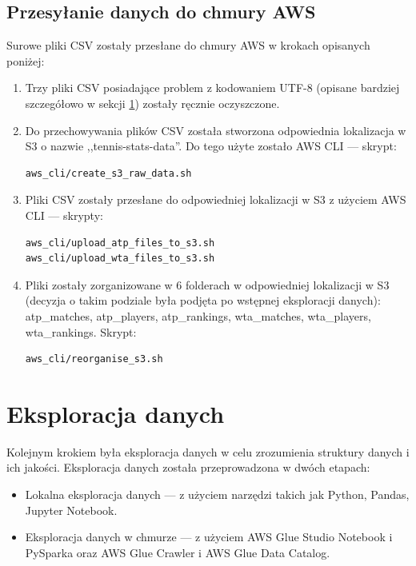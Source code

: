 \documentclass[12pt, a4paper]{article}
\begin{document}
\subsection{Przesyłanie danych do chmury AWS}
Surowe pliki CSV zostały przesłane do chmury AWS w krokach opisanych poniżej:
\begin{enumerate}
    \item Trzy pliki CSV posiadające problem z kodowaniem UTF-8 (opisane bardziej szczegółowo w sekcji \ref{sec:explore}) zostały ręcznie oczyszczone.
    \item Do przechowywania plików CSV została stworzona odpowiednia lokalizacja w S3 o nazwie ,,tennis-stats-data''. Do tego użyte zostało AWS CLI --- skrypt:
\begin{verbatim}
aws_cli/create_s3_raw_data.sh
\end{verbatim}
    \item Pliki CSV zostały przesłane do odpowiedniej lokalizacji w S3 z użyciem AWS CLI --- skrypty:
\begin{verbatim}
aws_cli/upload_atp_files_to_s3.sh
aws_cli/upload_wta_files_to_s3.sh
\end{verbatim}
    \item Pliki zostały zorganizowane w 6 folderach w odpowiedniej lokalizacji w S3 (decyzja o takim podziale była podjęta po wstępnej eksploracji danych): atp\_matches, atp\_players, atp\_rankings, wta\_matches, wta\_players, wta\_rankings. Skrypt:
\begin{verbatim}
aws_cli/reorganise_s3.sh
\end{verbatim}
\end{enumerate}


\section{Eksploracja danych} \label{sec:explore}
Kolejnym krokiem była eksploracja danych w celu zrozumienia struktury danych i ich jakości. Eksploracja danych została przeprowadzona w dwóch etapach:
\begin{itemize}
    \item Lokalna eksploracja danych --- z użyciem narzędzi takich jak Python, Pandas, Jupyter Notebook.
    \item Eksploracja danych w chmurze --- z użyciem AWS Glue Studio Notebook i PySparka oraz AWS Glue Crawler i AWS Glue Data Catalog.
\end{itemize}
\end{document}
